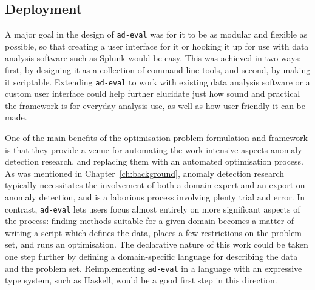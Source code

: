 \subsection{Deployment}
A major goal in the design of \texttt{ad-eval} was for it to be as modular and flexible as possible, so that creating a user interface for it or hooking it up for use with data analysis software such as Splunk would be easy. This was achieved in two ways: first, by designing it as a collection of command line tools, and second, by making it scriptable. Extending \texttt{ad-eval} to work with existing data analysis software or a custom user interface could help further elucidate just how sound and practical the framework is for everyday analysis use, as well as how user-friendly it can be made.

One of the main benefits of the optimisation problem formulation and framework is that they provide a venue for automating the work-intensive aspects anomaly detection research, and replacing them with an automated optimisation process. As was mentioned in Chapter~\ref{ch:background}, anomaly detection research typically necessitates the involvement of both a domain expert and an export on anomaly detection, and is a laborious process involving plenty trial and error. In contrast, \texttt{ad-eval} lets users focus almost entirely on more significant aspects of the process: finding methods suitable for a given domain becomes a matter of writing a script which defines the data, places a few restrictions on the problem set, and runs an optimisation. The declarative nature of this work could be taken one step further by defining a domain-specific language for describing the data and the problem set. Reimplementing \texttt{ad-eval} in a language with an expressive type system, such as Haskell, would be a good first step in this direction.
